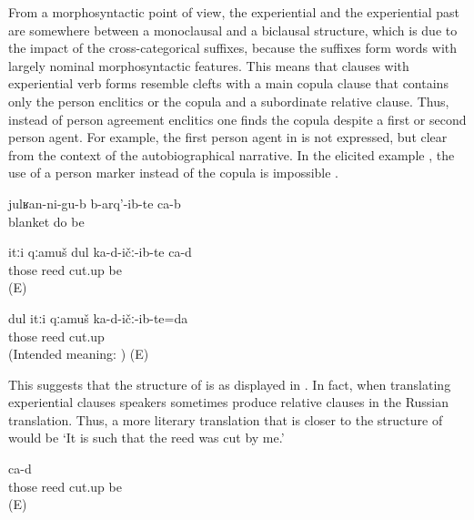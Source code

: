From a morphosyntactic point of view, the experiential and the experiential past are somewhere between a monoclausal and a biclausal structure, which is due to the impact of the cross-categorical suffixes, because the suffixes form words with largely nominal morphosyntactic features. This means that clauses with experiential verb forms resemble clefts with a main copula clause that contains only the person enclitics or the copula and a subordinate relative clause. Thus, instead of person agreement enclitics one finds the copula despite a first or second person agent. For example, the first person agent in  is not expressed, but clear from the context of the autobiographical narrative. In the elicited example , the use of a person marker instead of the copula is impossible .
%
\begin{exe}
	\ex	\label{ex:‎(I) gave birth to (my children) under a blanket analytic}
	\gll	julʁan-ni-gu-b	b-arq'-ib-te	ca-b\\
		blanket	do 	be\\
	\glt	{}
\end{exe}

\begin{exe}
\ex
\begin{xlist}
	\ex	\label{ex:I cut that reed analytic}
	\gll	itːi	qːamuš	dul	ka-d-ičː-ib-te	ca-d\\
		those	reed		cut.up	be\\
	\glt	{} (E)
	
		\ex	\label{Intended meaningI cut that reed.}
	\gll * dul itːi	qːamuš	ka-d-ičː-ib-te=da\\
	{}  those	reed cut.up \\
	\glt	{} (Intended meaning: ) (E)
\end{xlist}
\end{exe}

This suggests that the structure of  is as displayed in . In fact, when translating experiential clauses speakers sometimes produce relative clauses in the Russian translation. Thus, a more literary translation that is closer to the structure of  would be `It is such that the reed was cut by me.' 
%
\begin{exe}
	\ex	\label{ex:I cut that reed Russian relative clause analytic}
		ca-d\\
		those	reed		cut.up	be\\
	\glt	{} (E)
	

\end{exe}

